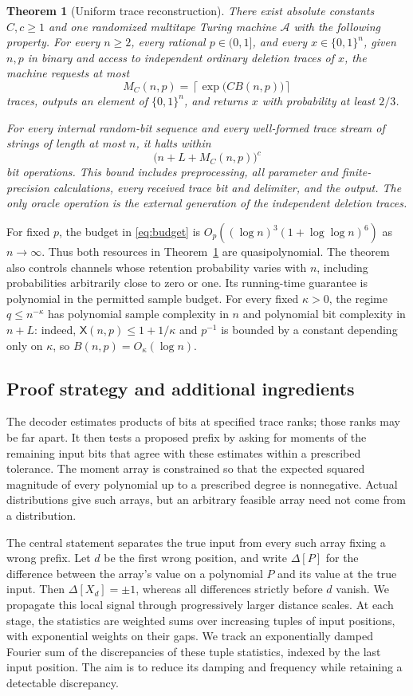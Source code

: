 \documentclass[11pt]{article}
\numberwithin{equation}{section}
\newtheorem{theorem}{Theorem}[section]
\theoremstyle{definition}
\theoremstyle{remark}
\begin{document}
\begin{theorem}[Uniform trace reconstruction]\label{thm:main}
There exist absolute constants $C,c\ge1$ and one randomized multitape
Turing machine $\mathcal A$ with the following property. For every
$n\ge2$, every rational $p\in(0,1]$, and every $x\in\{0,1\}^n$, given
$n,p$ in binary and access to independent ordinary deletion traces of
$x$, the machine requests at most
\[
 M_C(n,p)=\left\lceil\exp\bigl(CB(n,p)\bigr)\right\rceil
\]
traces, outputs an element of $\{0,1\}^n$, and returns $x$ with probability
at least $2/3$.

For every internal random-bit sequence and every well-formed trace
stream of strings of length at most $n$, it halts within
\[
 \bigl(n+L+M_C(n,p)\bigr)^c
\]
bit operations. This bound includes preprocessing, all parameter and
finite-precision calculations, every received trace bit and delimiter,
and the output. The only oracle operation is the external generation
of the independent deletion traces.
\end{theorem}

For fixed $p$, the budget in \eqref{eq:budget} is
$O_p((\log n)^3(1+\log\log n)^6)$ as $n\to\infty$.
Thus both resources in Theorem~\ref{thm:main} are quasipolynomial.
The theorem also controls channels whose retention probability varies
with $n$, including probabilities arbitrarily close to zero or one.
Its running-time guarantee is polynomial in the permitted sample budget.
For every fixed $\kappa>0$, the regime $q\le n^{-\kappa}$ has polynomial
sample complexity in $n$ and polynomial bit complexity in $n+L$:
indeed, $\mathsf X(n,p)\le1+1/\kappa$ and $p^{-1}$ is bounded by a
constant depending only on $\kappa$, so $B(n,p)=O_\kappa(\log n)$.



\subsection{Proof strategy and additional ingredients}
The decoder estimates products of bits at specified trace ranks; those
ranks may be far apart. It then tests a proposed prefix by asking for
moments of the remaining input bits that agree with these estimates within
a prescribed tolerance.
The moment array is constrained so that the expected squared magnitude
of every polynomial up to a prescribed degree is nonnegative. Actual
distributions give such arrays, but an arbitrary feasible array need
not come from a distribution.

The central statement separates the true input from every such array
fixing a wrong prefix. Let $d$ be the first wrong position, and write
$\Delta[P]$ for the difference between the array's value on a polynomial
$P$ and its value at the true input. Then $\Delta[X_d]=\pm1$, whereas
all differences strictly before $d$ vanish. We propagate this local
signal through progressively larger distance scales. At each stage,
the statistics are weighted sums over increasing tuples of input
positions, with exponential weights on their gaps.
We track an exponentially damped Fourier sum of the
discrepancies of these tuple statistics, indexed by the last input
position. The aim is to reduce its damping and frequency while retaining
a detectable discrepancy.
\end{document}
